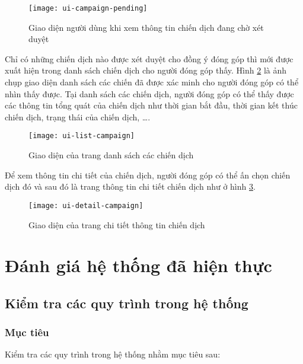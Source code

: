 \documentclass[../main-report.tex]{subfiles}
\begin{document}
\begin{figure}[ht!]
\begin{center}
\label{fig:ui-campaign-pending}
\texttt{[image: ui-campaign-pending]}
\caption{Giao diện người dùng khi xem thông tin chiến dịch đang chờ xét duyệt}
\end{center}
\end{figure}

Chỉ có những chiến dịch nào được xét duyệt cho đồng ý đóng góp thì mới được xuất hiện trong danh sách chiến dịch cho người đóng góp thấy. Hình \ref{fig:ui-list-campaign} là ảnh chụp giao diện danh sách các chiến đã được xác minh cho người đóng góp có thể nhìn thấy được. Tại danh sách các chiến dịch, người đóng góp có thể thấy được các thông tin tổng quát của chiến dịch như thời gian bắt đầu, thời gian kết thúc chiến dịch, trạng thái của chiến dịch, \ldots.

\begin{figure}[ht!]
\begin{center}
\label{fig:ui-list-campaign}
\texttt{[image: ui-list-campaign]}
\caption{Giao diện của trang danh sách các chiến dịch}
\end{center}
\end{figure}

Để xem thông tin chi tiết của chiến dịch, người đóng góp có thể ấn chọn chiến dịch đó và sau đó là trang thông tin chi tiết chiến dịch như ở hình \ref{fig:ui-detail-campaign}.

\begin{figure}[ht!]
\begin{center}
\label{fig:ui-detail-campaign}
\texttt{[image: ui-detail-campaign]}
\caption{Giao diện của trang chi tiết thông tin chiến dịch}
\end{center}
\end{figure}

\section{Đánh giá hệ thống đã hiện thực}
\subsection{Kiểm tra các quy trình trong hệ thống}
\subsubsection{Mục tiêu}
Kiểm tra các quy trình trong hệ thống nhằm mục tiêu sau:
\end{document}
